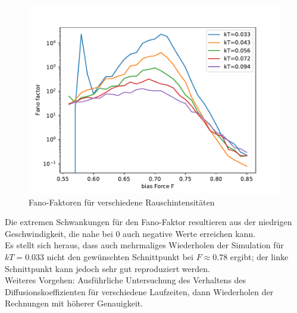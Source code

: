 \documentclass[12pt,a4paper]{article}
\begin{document}
\begin{figure}[H]
	\centering
	\includegraphics[scale=0.9]{mechfsht.pdf} 
	\caption{Fano-Faktoren für verschiedene Rauschintensitäten}
	\label{mfsh}
\end{figure}
Die extremen Schwankungen für den Fano-Faktor resultieren aus der niedrigen Geschwindigkeit, die nahe bei 0 auch negative Werte erreichen kann.\\
Es stellt sich heraus, dass auch mehrmaliges Wiederholen der Simulation für $kT=0.033$ nicht den gewünschten Schnittpunkt bei $F\approx 0.78$ ergibt; der linke Schnittpunkt kann jedoch sehr gut reproduziert werden.\\
Weiteres Vorgehen: Ausführliche Untersuchung des Verhaltens des Diffusionskoeffizienten für verschiedene Laufzeiten, dann
Wiederholen der Rechnungen mit höherer Genauigkeit.
\end{document}
